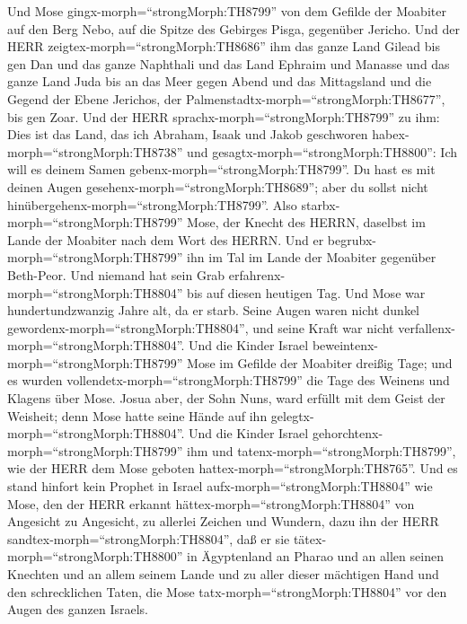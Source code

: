  Und Mose gingx-morph=``strongMorph:TH8799'' von dem Gefilde
der Moabiter auf den Berg Nebo, auf die Spitze des Gebirges Pisga,
gegenüber Jericho. Und der HERR zeigtex-morph=``strongMorph:TH8686'' ihm
das ganze Land Gilead bis gen Dan  und das ganze Naphthali
und das Land Ephraim und Manasse und das ganze Land Juda bis an das Meer
gegen Abend  und das Mittagsland und die Gegend der Ebene
Jerichos, der Palmenstadtx-morph=``strongMorph:TH8677'', bis gen Zoar.
 Und der HERR sprachx-morph=``strongMorph:TH8799'' zu ihm:
Dies ist das Land, das ich Abraham, Isaak und Jakob geschworen
habex-morph=``strongMorph:TH8738'' und
gesagtx-morph=``strongMorph:TH8800'': Ich will es deinem Samen
gebenx-morph=``strongMorph:TH8799''. Du hast es mit deinen Augen
gesehenx-morph=``strongMorph:TH8689''; aber du sollst nicht
hinübergehenx-morph=``strongMorph:TH8799''.  Also
starbx-morph=``strongMorph:TH8799'' Mose, der Knecht des HERRN, daselbst
im Lande der Moabiter nach dem Wort des HERRN.  Und er
begrubx-morph=``strongMorph:TH8799'' ihn im Tal im Lande der Moabiter
gegenüber Beth-Peor. Und niemand hat sein Grab
erfahrenx-morph=``strongMorph:TH8804'' bis auf diesen heutigen Tag.
 Und Mose war hundertundzwanzig Jahre alt, da er starb.
Seine Augen waren nicht dunkel gewordenx-morph=``strongMorph:TH8804'',
und seine Kraft war nicht verfallenx-morph=``strongMorph:TH8804''.
 Und die Kinder Israel
beweintenx-morph=``strongMorph:TH8799'' Mose im Gefilde der Moabiter
dreißig Tage; und es wurden vollendetx-morph=``strongMorph:TH8799'' die
Tage des Weinens und Klagens über Mose.  Josua aber, der
Sohn Nuns, ward erfüllt mit dem Geist der Weisheit; denn Mose hatte
seine Hände auf ihn gelegtx-morph=``strongMorph:TH8804''. Und die Kinder
Israel gehorchtenx-morph=``strongMorph:TH8799'' ihm und
tatenx-morph=``strongMorph:TH8799'', wie der HERR dem Mose geboten
hattex-morph=``strongMorph:TH8765''.  Und es stand hinfort
kein Prophet in Israel aufx-morph=``strongMorph:TH8804'' wie Mose, den
der HERR erkannt hättex-morph=``strongMorph:TH8804'' von Angesicht zu
Angesicht,  zu allerlei Zeichen und Wundern, dazu ihn der
HERR sandtex-morph=``strongMorph:TH8804'', daß er sie
tätex-morph=``strongMorph:TH8800'' in Ägyptenland an Pharao und an allen
seinen Knechten und an allem seinem Lande  und zu aller
dieser mächtigen Hand und den schrecklichen Taten, die Mose
tatx-morph=``strongMorph:TH8804'' vor den Augen des ganzen Israels.
